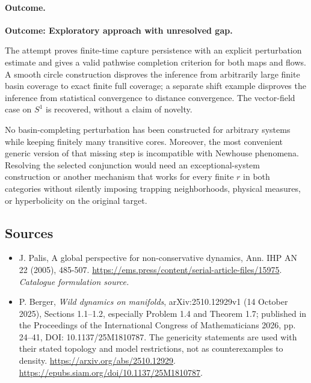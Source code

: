 \documentclass[11pt,a4paper]{article}
\begin{document}
\paragraph{Outcome.}
\textbf{Outcome: Exploratory approach with unresolved gap.}

The attempt proves finite-time capture persistence with an explicit
perturbation estimate and gives a valid pathwise completion criterion
for both maps and flows. A smooth circle construction disproves the
inference from arbitrarily large finite basin coverage to exact finite
full coverage; a separate shift example disproves the inference from
statistical convergence to distance convergence. The vector-field case
on $S^1$ is recovered, without a claim of novelty.

No basin-completing perturbation has been constructed for arbitrary
systems while keeping finitely many transitive cores. Moreover, the
most convenient generic version of that missing step is incompatible
with Newhouse phenomena. Resolving the selected conjunction would need
an exceptional-system construction or another mechanism that works
for every finite $r$ in both categories without silently imposing
trapping neighborhoods, physical measures, or hyperbolicity on the
original target.

\subsection{Sources}
\begin{itemize}\raggedright
\item[\textnormal{[S1]}]\hypertarget{source:statement:1}{} J. Palis, A global perspective for non-conservative dynamics, Ann. IHP AN 22 (2005), 485-507.
\url{https://ems.press/content/serial-article-files/15975}.
{\small\textit{Catalogue formulation source.}}
\item[\textnormal{[E1]}]\hypertarget{extra:statement:1}{}
P. Berger, \emph{Wild dynamics on manifolds}, arXiv:2510.12929v1
(14 October 2025), Sections 1.1--1.2, especially Problem 1.4 and
Theorem 1.7; published in the Proceedings of the International Congress
of Mathematicians 2026, pp. 24--41, DOI: 10.1137/25M1810787.
The genericity statements are used with their stated topology and
model restrictions, not as counterexamples to density.
\url{https://arxiv.org/abs/2510.12929}.
\url{https://epubs.siam.org/doi/10.1137/25M1810787}.
\end{itemize}
\end{document}
